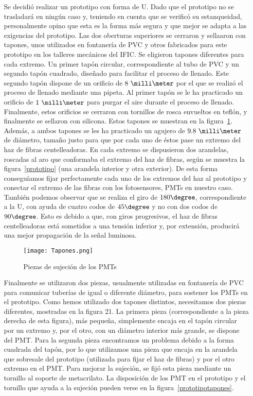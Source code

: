 Se decidió realizar un prototipo con forma de U. Dado que el prototipo no se trasladará en ningún caso y, teniendo en cuenta que se verificó su estanqueidad, personalmente opino que esta es la forma más segura y que mejor se adapta a las exigencias del prototipo. Las dos oberturas superiores se cerraron  y sellaaron con tapones, unos utilizados en fontanería de PVC y otros fabricados para este prototipo en los talleres mecánicos del IFIC. Se eligieron tapones diferentes para cada extremo. Un primer tapón circular,  correspondiente al tubo de PVC y un segundo tapón cuadrado, diseñado para facilitar el proceso de llenado. Este segundo tapón dispone de  un orificio de $8~\milli\meter$ por el que se realizó el proceso de llenado  mediante una pipeta. Al primer tapón  se le ha practicado  un orificio de $1~\milli\meter$ para purgar el aire durante el  proceso de llenado. Finalmente, estos orificios se cerraron con  tornillos de rosca envueltos en teflón, y finalmente se sellaron con silicona. Estos tapones se muestran en la figura~\ref{tapones}.
Además, a ambos tapones se les ha practicado un agujero de $9.8~\milli\meter$ de diámetro, tamaño justo para que por cada uno de éstos pase un extremo del haz de fibras centelleadoras. En cada extremo se dispusieron dos arandelas, roscadas al aro que conformaba el extremo del haz de fibras, según se muestra  la figura~\ref{prototipo} (una arandela interior y otra exterior). De esta forma conseguíamos fijar perfectamente cada uno de los extremos del haz al prototipo y conectar el extremo de las fibras con los fotosensores, PMTs en nuestro caso. 
También podemos observar que se realiza el giro de $180\degree$, correspondiente a la U, con ayuda de cuatro codos de $45\degree$ y no con dos codos de $90\degree$. Esto es debido a que, con giros progresivos, el haz de fibras centelleadoras está sometidos a una tensión inferior y, por extensión, producirá una mejor propagación de la señal luminosa.

\begin{figure}[hbtp]
\centering
\texttt{[image: Tapones.png]}\\
\caption{ Piezas de sujeción de los PMTs\label{tapones}
}
\end{figure}



Finalmente se utilizaron dos piezas, usualmente utilizadas en fontanería de PVC para comunicar tuberías de igual o diferente diámetro, para sostener los PMTs en el prototipo. Como hemos utilizado dos tapones distintos, necesitamos dos piezas diferentes, mostradas en la figura 21.
La primera pieza (correspondiente a la pieza derecha de esta figura), más pequeña, simplemente encaja en el  tapón circular por un extremo y, por el otro, con un diámetro interior más grande, se dispone del PMT.
Para la segunda pieza encontramos un problema debido a la forma cuadrada del tapón, por lo que utilizamos una pieza  que encaja en la arandela que sobresale del prototipo (utilizada para fijar el haz de fibras) y por el otro extremo  en  el PMT. Para mejorar la sujeción, se fijó  esta pieza  mediante un tornillo  al soporte de metacrilato. La disposición de los PMT en el prototipo y el tornillo que ayuda a la sujeción pueden verse  en  la figura~\ref{prototipotapones}.

